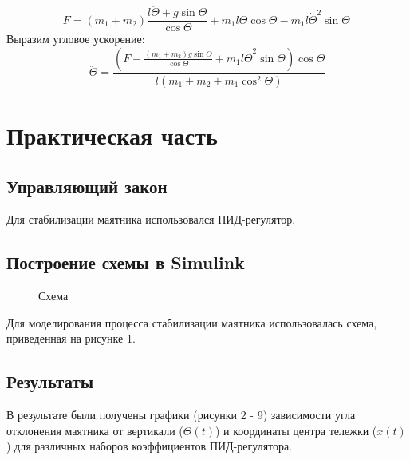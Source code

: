 \documentclass[a5paper, 10pt]{article}
\theoremstyle{definition}
\theoremstyle{plain}
\theoremstyle{remark}
\begin{document}
\begin{equation}
F = (m_1 + m_2) \frac{l \ddot{\Theta} + g \sin \Theta }{ \cos \Theta} + m_1 l \ddot{\Theta} \cos \Theta - m_1 l \dot{\Theta} ^2 \sin \Theta \,
\end{equation}
Выразим угловое ускорение:
\begin{equation}
\ddot{\Theta} = \frac{\left( F - \frac{(m_1 + m_2) g \sin \Theta}{\cos \Theta} + m_1 l \dot{\Theta}^2 \sin \Theta \right) \cos \Theta}{l \left( m_1 + m_2 + m_1 \cos^2 \Theta \right)}
\end{equation}

\newpage
\section{Практическая часть}	
\subsection{Управляющий закон}
Для стабилизации маятника использовался ПИД-регулятор.
\subsection{Построение схемы в Simulink}
\begin{figure}[h]
	           \caption{Схема}
\end{figure}
Для моделирования процесса стабилизации маятника использовалась схема, приведенная на рисунке 1.
\subsection{Результаты}
В результате были получены графики (рисунки 2 - 9) зависимости угла отклонения маятника от вертикали ($\Theta (t)$) и координаты центра тележки ($x(t)$) для различных наборов коэффициентов ПИД-регулятора.
\end{document}
